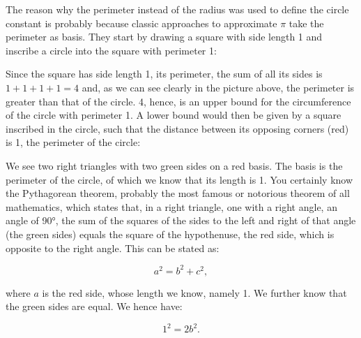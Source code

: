 \documentclass[tikz]{scrreprt}
\begin{document}
The reason why the perimeter 
instead of the radius was used
to define the circle constant is probably
because classic approaches to approximate $\pi$
take the perimeter as basis.
They start by drawing a square with side length 1
and inscribe a circle into the square with 
perimeter 1:

\begin{center}
\end{center}

Since the square has side length 1,
its perimeter, the sum of all its sides is
$1+1+1+1 = 4$ and, as we can see clearly
in the picture above, the perimeter
is greater than that of the circle.
4, hence, is an upper bound for the circumference
of the circle with perimeter 1.
A lower bound would then be given
by a square inscribed in the circle,
such that the distance between 
its opposing corners (red) is 1, the perimeter
of the circle:

\begin{center}
\end{center}

We see two right triangles with two green sides 
on a red basis. The basis is the perimeter
of the circle, of which we know that its length is 1.
You certainly know the Pythagorean theorem,
probably the most famous or notorious theorem of all mathematics,
which states that, in a right triangle,
one with a right angle, an angle of 90°, the sum of the squares
of the sides to the left and right of that angle (the green sides)
equals the square of the hypothenuse, the red side,
which is opposite to the right angle.
This can be stated as:

\begin{equation}
a^2 = b^2 + c^2,
\end{equation}

where $a$ is the red side, whose length we know,
namely 1. We further know that the green sides
are equal. We hence have:

\begin{equation}
1^2 = 2b^2.
\end{equation}
\end{document}
